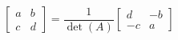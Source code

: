 \documentclass{article}
\begin{document}
\[
\begin{bmatrix}
a & b \\
c & d
\end{bmatrix}
=
\frac{1}{\det(A)}
\begin{bmatrix}
d & -b \\
-c & a
\end{bmatrix}
\]
\end{document}
